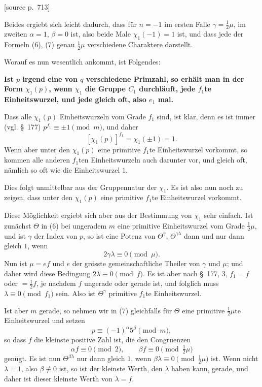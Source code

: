 \documentclass[11pt]{article}
\newcommand{\srcpage}[1]{\par\medskip\noindent\textsf{[source p.~#1]}\par\smallskip}
\begin{document}
\srcpage{713}
Beides ergiebt sich leicht dadurch, dass für $n=-1$ im ersten Falle $\gamma=\frac12\mu$, im zweiten $\alpha=1$, $\beta=0$ ist, also beide Male $\chi_1(-1)=1$ ist, und dass jede der Formeln (6), (7) genau $\frac12\mu$ verschiedene Charaktere darstellt.

Worauf es nun wesentlich ankommt, ist Folgendes:
\begin{center}
\textbf{Ist $p$ irgend eine von $q$ verschiedene Primzahl, so erhält man in der Form $\chi_1(p)$, wenn $\chi_1$ die Gruppe $C_1$ durchläuft, jede $f_1$te Einheitswurzel, und jede gleich oft, also $e_1$ mal.}
\end{center}
Dass alle $\chi_1(p)$ Einheitswurzeln vom Grade $f_1$ sind, ist klar, denn es ist immer (vgl. \S~177) $p^{f_1}\equiv\pm1\pmod m$, und daher
\[
[\chi_1(p)]^{f_1}=\chi_1(\pm1)=1.
\]
Wenn aber unter den $\chi_1(p)$ eine primitive $f_1$te Einheitswurzel vorkommt, so kommen alle anderen $f_1$ten Einheitswurzeln auch darunter vor, und gleich oft, nämlich so oft wie die Einheitswurzel $1$.

Dies folgt unmittelbar aus der Gruppennatur der $\chi_1$. Es ist also nun noch zu zeigen, dass unter den $\chi_1(p)$ eine primitive $f_1$te Einheitswurzel vorkommt.

Diese Möglichkeit ergiebt sich aber aus der Bestimmung von $\chi_1$ sehr einfach. Ist zunächst $\Theta$ in (6) bei ungeradem $m$ eine primitive Einheitswurzel vom Grade $\frac12\mu$, und ist $\gamma$ der Index von $p$, so ist eine Potenz von $\Theta^\gamma$, $\Theta^{\gamma\lambda}$ dann und nur dann gleich $1$, wenn
\[
2\gamma\lambda\equiv0\pmod\mu.
\]
Nun ist $\mu=ef$ und $e$ der grösste gemeinschaftliche Theiler von $\gamma$ und $\mu$; und daher wird diese Bedingung $2\lambda\equiv0\pmod f$. Es ist aber nach \S~177, 3, $f_1=f$ oder $=\frac12f$, je nachdem $f$ ungerade oder gerade ist, und folglich muss $\lambda\equiv0\pmod {f_1}$ sein. Also ist $\Theta^\gamma$ primitive $f_1$te Einheitswurzel.

Ist aber $m$ gerade, so nehmen wir in (7) gleichfalls für $\Theta$ eine primitive $\frac12\mu$te Einheitswurzel und setzen
\[
p\equiv(-1)^\alpha5^\beta\pmod m,
\]
so dass $f$ die kleinste positive Zahl ist, die den Congruenzen
\[
\alpha f\equiv0\pmod2,
\qquad
\beta f\equiv0\pmod{\tfrac12\mu}
\]
genügt. Es ist nun $\Theta^{\beta\lambda}$ nur dann gleich $1$, wenn $\beta\lambda\equiv0\pmod{\frac12\mu}$ ist. Wenn nicht $\lambda=1$, also $\beta\not\equiv0$ ist, so ist der kleinste Werth, den $\lambda$ haben kann, gerade, und daher ist dieser kleinste Werth von $\lambda=f$.
\end{document}
